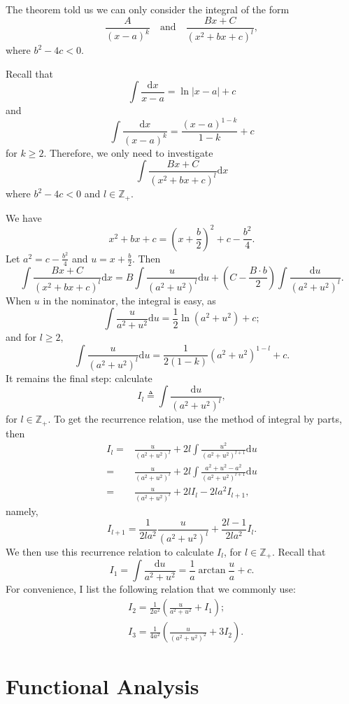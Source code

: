 \documentclass[12pt,a4paper]{article}
\numberwithin{equation}{section}
\theoremstyle{mystyle}
\newcommand{\Z}{\mathbb{Z}}
\renewcommand{\d}{\mathrm{d}}
\newcommand{\abs}[1]{\left\lvert #1 \right\rvert}
\begin{document}
	The theorem told us we can only consider the integral of the form
	$$\frac{A}{(x-a)^k} \quad \text{and}\quad   \frac{Bx+C}{(x^2+bx+c)^l},$$
	where $b^2-4c<0$.
	
	Recall that $$\int \frac{\d x}{x-a} = \ln \abs{x-a}+c$$ and $$\int\frac{\d x}{(x-a)^k}=\frac{(x-a)^{1-k}}{1-k}+c$$ for $k\geq 2$. Therefore, we only need to investigate $$\int  \frac{Bx+C}{(x^2+bx+c)^l} \d x$$ where $b^2-4c<0$ and $l\in \Z_{+}$.
	
	We have 
	$$
	x^2+bx+c=(x+\frac{b}{2})^2+c-\frac{b^2}{4}.
	$$
	Let $a^2=c-\frac{b^2}{4}$ and $u=x+\frac{b}{2}$. Then
	\[
	\int  \frac{Bx+C}{(x^2+bx+c)^l} \d x = B\int \frac{u}{(a^2+u^2)^l}\d u+(C-\frac{B\cdot b}{2})\int \frac{\d u}{(a^2+u^2)^l}.
	\]
	When $u$ in the nominator, the integral is easy, as 
	$$
	\int \frac{u}{a^2+u^2}\d u=\frac{1}{2}\ln (a^2+u^2)+c;$$ and for $l\geq 2$, 
	$$
	\int \frac{u}{(a^2+u^2)^l}\d u=\frac{1}{2(1-k)}(a^2+u^2)^{1-l}+c.
	$$ It remains the final step: calculate $$I_l\triangleq \int \frac{\d u}{(a^2+u^2)^l},$$ for $l\in \Z_+$.
	To get the recurrence relation, use the method of integral by parts, then
	\begin{align*}
		I_l =& \frac{u}{(a^2+u^2)^l}+2l\int \frac{u^2}{(a^2+u^2)^{l+1}}\d u\\
		=&\frac{u}{(a^2+u^2)^l}+2l\int\frac{a^2+u^2-a^2}{(a^2+u^2)^{l+1}}\d u\\
		=& \frac{u}{(a^2+u^2)^l}+2l I_l - 2la^2 I_{l+1},
	\end{align*}
	namely,
	\begin{equation}
		I_{l+1}=\frac{1}{2la^2}\frac{u}{(a^2+u^2)^l}+\frac{2l-1}{2la^2}I_l.
	\end{equation}
	We then use this recurrence relation to calculate $I_l$, for $l\in \Z_+$. Recall that 
	$$
	I_1=\int \frac{\d u}{a^2+u^2} = \frac{1}{a}\arctan{\frac{u}{a}}+c.
	$$
	For convenience, I list the following relation that we commonly use:
	\begin{align}
		&I_2=\frac{1}{2a^2}\left(\frac{u}{a^2+u^2}+I_1\right);\\
		&I_3 = \frac{1}{4a^2}\left(\frac{u}{(a^2+u^2)^2}+3I_2\right).
	\end{align}
	
	
	
	
	
	
	\part{Functional Analysis}
\end{document}
